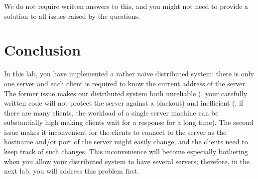 \documentclass[a4paper]{article}
\begin{document}
We do not require written answers to this, and you might not need to
provide a solution to all issues raised by the questions.

\section{Conclusion}
In this lab, you have implemented a rather na\"{i}ve distributed system: there
is only one server and each client is required to know the current address of
the server. The former issue makes our distributed system both unreliable (\eg,
your carefully written code will not protect the server against a blackout) and
inefficient (\eg, if there are many clients, the workload of a single server
machine can be substantially high making clients wait for a response for a long
time). The second issue makes it inconvenient for the clients to connect to the
server as the hostname and/or port of the server might easily change, and the
clients need to keep track of such changes. This inconvenience will become
especially bothering when you allow your distributed system to have several
servers; therefore, in the next lab, you will address this problem first.

\printbibliography
\end{document}
